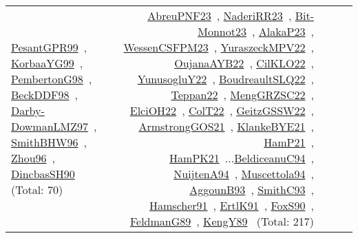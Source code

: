 {\begin{longtable}{p{3cm}r>{\raggedright\arraybackslash}p{6cm}>{\raggedright\arraybackslash}p{6cm}>{\raggedright\arraybackslash}p{8cm}}
\href{../works/PesantGPR99.pdf}{PesantGPR99}~\cite{PesantGPR99}, \href{../works/KorbaaYG99.pdf}{KorbaaYG99}~\cite{KorbaaYG99}, \href{../works/PembertonG98.pdf}{PembertonG98}~\cite{PembertonG98}, \href{../works/BeckDDF98.pdf}{BeckDDF98}~\cite{BeckDDF98}, \href{../works/Darby-DowmanLMZ97.pdf}{Darby-DowmanLMZ97}~\cite{Darby-DowmanLMZ97}, \href{../works/SmithBHW96.pdf}{SmithBHW96}~\cite{SmithBHW96}, \href{../works/Zhou96.pdf}{Zhou96}~\cite{Zhou96}, \href{../works/DincbasSH90.pdf}{DincbasSH90}~\cite{DincbasSH90} (Total: 70) & \href{../works/AbreuPNF23.pdf}{AbreuPNF23}~\cite{AbreuPNF23}, \href{../works/NaderiRR23.pdf}{NaderiRR23}~\cite{NaderiRR23}, \href{../works/Bit-Monnot23.pdf}{Bit-Monnot23}~\cite{Bit-Monnot23}, \href{../works/AlakaP23.pdf}{AlakaP23}~\cite{AlakaP23}, \href{../works/WessenCSFPM23.pdf}{WessenCSFPM23}~\cite{WessenCSFPM23}, \href{../works/YuraszeckMPV22.pdf}{YuraszeckMPV22}~\cite{YuraszeckMPV22}, \href{../works/OujanaAYB22.pdf}{OujanaAYB22}~\cite{OujanaAYB22}, \href{../works/CilKLO22.pdf}{CilKLO22}~\cite{CilKLO22}, \href{../works/YunusogluY22.pdf}{YunusogluY22}~\cite{YunusogluY22}, \href{../works/BoudreaultSLQ22.pdf}{BoudreaultSLQ22}~\cite{BoudreaultSLQ22}, \href{../works/Teppan22.pdf}{Teppan22}~\cite{Teppan22}, \href{../works/MengGRZSC22.pdf}{MengGRZSC22}~\cite{MengGRZSC22}, \href{../works/ElciOH22.pdf}{ElciOH22}~\cite{ElciOH22}, \href{../works/ColT22.pdf}{ColT22}~\cite{ColT22}, \href{../works/GeitzGSSW22.pdf}{GeitzGSSW22}~\cite{GeitzGSSW22}, \href{../works/ArmstrongGOS21.pdf}{ArmstrongGOS21}~\cite{ArmstrongGOS21}, \href{../works/KlankeBYE21.pdf}{KlankeBYE21}~\cite{KlankeBYE21}, \href{../works/HamP21.pdf}{HamP21}~\cite{HamP21}, \href{../works/HamPK21.pdf}{HamPK21}~\cite{HamPK21}...\href{../works/BeldiceanuC94.pdf}{BeldiceanuC94}~\cite{BeldiceanuC94}, \href{../works/NuijtenA94.pdf}{NuijtenA94}~\cite{NuijtenA94}, \href{../works/Muscettola94.pdf}{Muscettola94}~\cite{Muscettola94}, \href{../works/AggounB93.pdf}{AggounB93}~\cite{AggounB93}, \href{../works/SmithC93.pdf}{SmithC93}~\cite{SmithC93}, \href{../works/Hamscher91.pdf}{Hamscher91}~\cite{Hamscher91}, \href{../works/ErtlK91.pdf}{ErtlK91}~\cite{ErtlK91}, \href{../works/FoxS90.pdf}{FoxS90}~\cite{FoxS90}, \href{../works/FeldmanG89.pdf}{FeldmanG89}~\cite{FeldmanG89}, \href{../works/KengY89.pdf}{KengY89}~\cite{KengY89} (Total: 217)\\

\end{longtable}}
